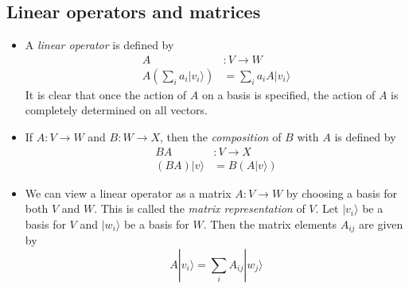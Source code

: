 \documentclass[12 pt]{article}
\begin{document}
\subsection{Linear operators and matrices}
\begin{itemize}
	\item A \emph{linear operator} is defined by
	\begin{align*}
		A&:V \to W \\
		A(\sum_i a_i|v_i\rangle)&=\sum_ia_i A|v_i\rangle
	\end{align*}
	It is clear that once the action of $A$ on a basis is specified, the action of $A$ is completely determined on all vectors.
	\item If $A:V \to W$ and $B:W \to X$, then the \emph{composition} of $B$ with $A$ is defined by
	\begin{align*}
		BA&:V \to X \\
		(BA)|v\rangle &=B(A|v\rangle)
	\end{align*}
	\item We can view a linear operator as a matrix $A:V \to W$ by choosing a basis for both $V$ and $W$. This is called the \emph{matrix representation} of $V$. Let $|v_i\rangle$ be a basis for $V$ and $|w_i\rangle$ be a basis for $W$. Then the matrix elements $A_{ij}$ are given by
	$$A|v_i\rangle = \sum_i A_{ij}|w_j\rangle$$
\end{itemize}
\end{document}
